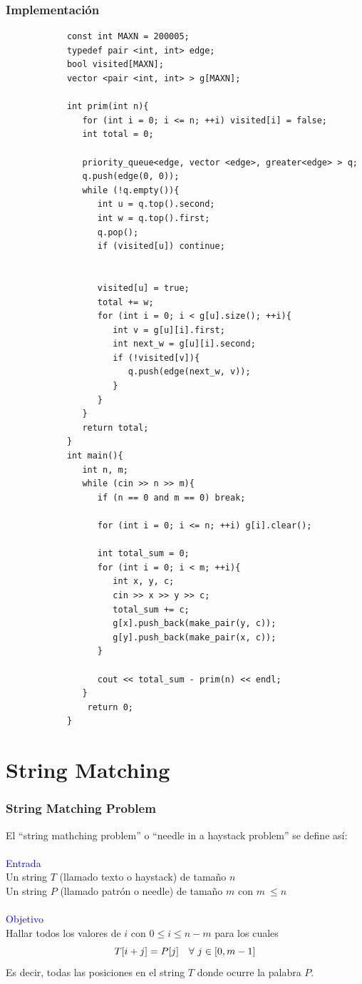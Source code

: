 \documentclass{beamer}
\begin{document}
	
	\begin{frame}
		\frametitle{Implementación}
		\begin{lstlisting}
			const int MAXN = 200005;
			typedef pair <int, int> edge;
			bool visited[MAXN];
			vector <pair <int, int> > g[MAXN]; 

			int prim(int n){
			   for (int i = 0; i <= n; ++i) visited[i] = false;
			   int total = 0;

			   priority_queue<edge, vector <edge>, greater<edge> > q;
			   q.push(edge(0, 0));
			   while (!q.empty()){
			      int u = q.top().second;
			      int w = q.top().first;
			      q.pop();
			      if (visited[u]) continue;

			      
			      visited[u] = true;
			      total += w;
			      for (int i = 0; i < g[u].size(); ++i){
			         int v = g[u][i].first;
			         int next_w = g[u][i].second;
			         if (!visited[v]){
			            q.push(edge(next_w, v));
			         }
			      }
			   }
			   return total;
			}
			int main(){
			   int n, m;
			   while (cin >> n >> m){
			      if (n == 0 and m == 0) break;

			      for (int i = 0; i <= n; ++i) g[i].clear();

			      int total_sum = 0;
			      for (int i = 0; i < m; ++i){
			         int x, y, c;
			         cin >> x >> y >> c;
			         total_sum += c;
			         g[x].push_back(make_pair(y, c));
			         g[y].push_back(make_pair(x, c));
			      }

			      cout << total_sum - prim(n) << endl;
			   }
			    return 0;
			}
		\end{lstlisting}
	\end{frame}

\section{String Matching}

	\begin{frame}
		\frametitle{String Matching Problem}
		El ``string mathching problem'' o ``needle in a haystack problem'' se define así:\\ \quad \\
		
		\textcolor{blue}{\large Entrada}\\
		Un string $T$ (llamado texto o haystack) de tamaño $n$\\ 
		Un string $P$ (llamado patrón o needle) de tamaño $m$ con $m\ \leq n$ \\ \quad \\
		\textcolor{blue}{\large Objetivo}\\
		Hallar todos los valores de $i$ con $0 \leq i \leq n - m$ para los cuales 
		$$T[i + j] = P[j] \text{\quad} \forall \,\, j \in [0, m-1]$$
		Es decir, todas las posiciones en el string $T$ donde ocurre la palabra $P$.\\
	\end{frame}
	
\end{document}
